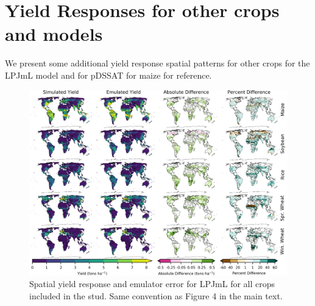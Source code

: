 \documentclass[12pt]{article}
\begin{document}
{{%

\clearpage
\section{Yield Responses for other crops and models}
\begin{flushleft}
We present some additional yield response spatial patterns for other crops for the LPJmL model and for pDSSAT for maize for reference. 
\end{flushleft}

\begin{figure}[h!]
  \includegraphics[width=\textwidth]{lpjml_grid.png}
  \caption{Spatial yield response and emulator error for LPJmL for all crops included in the stud. Same convention as Figure 4 in the main text.}
  \label{fig:lpjmlrice}
\end{figure}

}}
\end{document}
